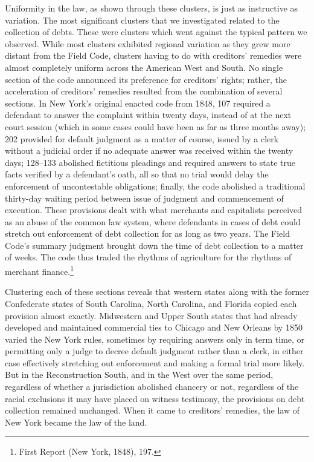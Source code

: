 \documentclass[12pt,]{article}
\let\rmarkdownfootnote\footnote%
\def\footnote{\protect\rmarkdownfootnote}
\begin{document}
Uniformity in the law, as shown through these clusters, is just as
instructive as variation. The most significant clusters that we
investigated related to the collection of debts. These were clusters
which went against the typical pattern we observed. While most clusters
exhibited regional variation as they grew more distant from the Field
Code, clusters having to do with creditors' remedies were almost
completely uniform across the American West and South. No single section
of the code announced its preference for creditors' rights; rather, the
acceleration of creditors' remedies resulted from the combination of
several sections. In New York's original enacted code from 1848, 107
required a defendant to answer the complaint within twenty days, instead
of at the next court session (which in some cases could have been as far
as three months away); 202 provided for default judgment as a matter of
course, issued by a clerk without a judicial order if no adequate answer
was received within the twenty days; 128--133 abolished fictitious
pleadings and required answers to state true facts verified by a
defendant's oath, all so that no trial would delay the enforcement of
uncontestable obligations; finally, the code abolished a traditional
thirty-day waiting period between issue of judgment and commencement of
execution. These provisions dealt with what merchants and capitalists
perceived as an abuse of the common law system, where defendants in
cases of debt could stretch out enforcement of debt collection for as
long as two years. The Field Code's summary judgment brought down the
time of debt collection to a matter of weeks. The code thus traded the
rhythms of agriculture for the rhythms of merchant finance.\footnote{First
  Report (New York, 1848), 197.}

Clustering each of these sections reveals that western states along with
the former Confederate states of South Carolina, North Carolina, and
Florida copied each provision almost exactly. Midwestern and Upper South
states that had already developed and maintained commercial ties to
Chicago and New Orleans by 1850 varied the New York rules, sometimes by
requiring answers only in term time, or permitting only a judge to
decree default judgment rather than a clerk, in either case effectively
stretching out enforcement and making a formal trial more likely. But in
the Reconstruction South, and in the West over the same period,
regardless of whether a jurisdiction abolished chancery or not,
regardless of the racial exclusions it may have placed on witness
testimony, the provisions on debt collection remained unchanged. When it
came to creditors' remedies, the law of New York became the law of the
land.
\end{document}
